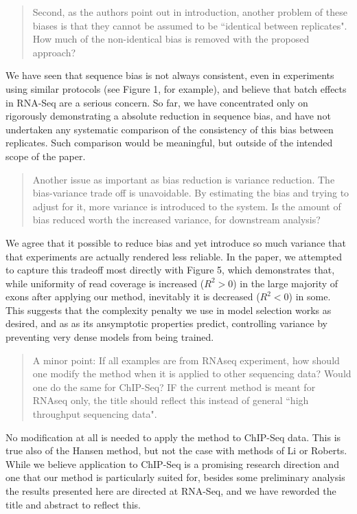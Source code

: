 \documentclass{article}
\begin{document}
\begin{quote}
Second, as the authors point out in introduction, another problem of
these biases is that they cannot be assumed to be ``identical between
replicates". How much of the non-identical bias is removed with the
proposed approach?
\end{quote}

We have seen that sequence bias is not always consistent, even in experiments
using similar protocols (see Figure 1, for example), and believe that batch
effects in RNA-Seq are a serious concern. So far, we have concentrated only on
rigorously demonstrating a absolute reduction in sequence bias, and have not
undertaken any systematic comparison of the consistency of this bias between
replicates. Such comparison would be meaningful, but outside of the intended
scope of the paper.


\begin{quote}
Another issue as important as bias reduction is variance reduction. The
bias-variance trade off is unavoidable. By estimating the bias and trying to
adjust for it, more variance is introduced to the system. Is the amount of bias
reduced worth the increased variance, for downstream analysis?
\end{quote}

We agree that it possible to reduce bias and yet introduce so much variance that
that experiments are actually rendered less reliable. In the paper, we attempted
to capture this tradeoff most directly with Figure 5, which demonstrates that,
while uniformity of read coverage is increased ($R^2 > 0$) in the large majority
of exons after applying our method, inevitably it is decreased ($R^2 < 0$) in
some. This suggests that the complexity penalty we use in model selection works
as desired, and as as its ansymptotic properties predict, controlling variance by
preventing very dense models from being trained.


\begin{quote}
A minor point: If all examples are from RNAseq experiment, how should
one modify the method when it is applied to other sequencing data?
Would one do the same for ChIP-Seq? IF the current method is meant for
RNAseq only, the title should reflect this instead of general ``high
throughput sequencing data".
\end{quote}

No modification at all is needed to apply the method to ChIP-Seq data. This is
true also of the Hansen method, but not the case with methods of Li or Roberts.
While we believe application to ChIP-Seq is a promising research direction and
one that our method is particularly suited for, besides some preliminary
analysis the results presented here are directed at RNA-Seq, and we have
reworded the title and abstract to reflect this.
\end{document}

